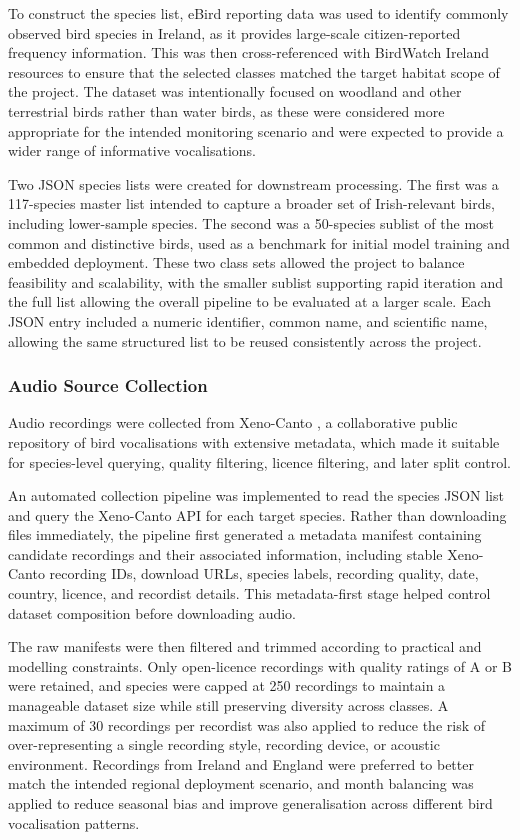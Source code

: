 \documentclass[conference]{IEEEtran}
\begin{document}
To construct the species list, eBird reporting data was used to identify commonly observed bird species in Ireland, as it provides large-scale citizen-reported frequency information. This was then cross-referenced with BirdWatch Ireland resources to ensure that the selected classes matched the target habitat scope of the project. The dataset was intentionally focused on woodland and other terrestrial birds rather than water birds, as these were considered more appropriate for the intended monitoring scenario and were expected to provide a wider range of informative vocalisations.

Two JSON species lists were created for downstream processing. The first was a 117-species master list intended to capture a broader set of Irish-relevant birds, including lower-sample species. The second was a 50-species sublist of the most common and distinctive birds, used as a benchmark for initial model training and embedded deployment. These two class sets allowed the project to balance feasibility and scalability, with the smaller sublist supporting rapid iteration and the full list allowing the overall pipeline to be evaluated at a larger scale. Each JSON entry included a numeric identifier, common name, and scientific name, allowing the same structured list to be reused consistently across the project.

\subsubsection{Audio Source Collection}
Audio recordings were collected from Xeno-Canto \cite{vellinga2015xc}, a collaborative public repository of bird vocalisations with extensive metadata, which made it suitable for species-level querying, quality filtering, licence filtering, and later split control.

An automated collection pipeline was implemented to read the species JSON list and query the Xeno-Canto API for each target species. Rather than downloading files immediately, the pipeline first generated a metadata manifest containing candidate recordings and their associated information, including stable Xeno-Canto recording IDs, download URLs, species labels, recording quality, date, country, licence, and recordist details. This metadata-first stage helped control dataset composition before downloading audio.

The raw manifests were then filtered and trimmed according to practical and modelling constraints. Only open-licence recordings with quality ratings of A or B were retained, and species were capped at 250 recordings to maintain a manageable dataset size while still preserving diversity across classes. A maximum of 30 recordings per recordist was also applied to reduce the risk of over-representing a single recording style, recording device, or acoustic environment. Recordings from Ireland and England were preferred to better match the intended regional deployment scenario, and month balancing was applied to reduce seasonal bias and improve generalisation across different bird vocalisation patterns.
\end{document}
